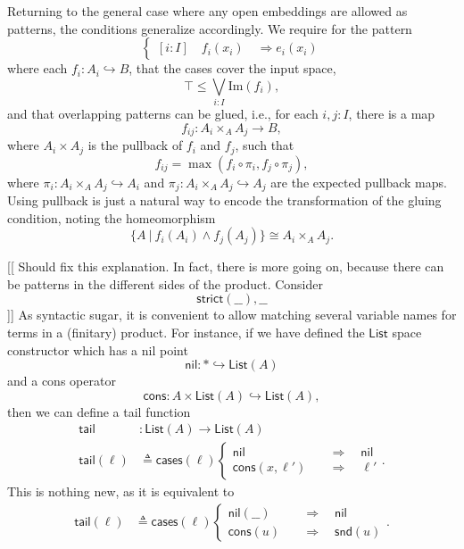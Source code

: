 \documentclass[conference]{IEEEtran}
\newcommand{\hookto}{\hookrightarrow}
\newcommand{\suchthat}{\ |\ }
\newcommand{\One}{\ast}
\newcommand{\wildcard}{\_\_}
\newcommand{\Img}[1]{\text{Im}\left({#1}\right)}
\newcommand{\Branch}{\Rightarrow}
\begin{document}
Returning to the general case where any open embeddings are allowed as patterns, the conditions generalize accordingly. We require for the pattern
\[
\begin{cases}
[i : I] \quad f_i(x_i) \quad \Branch e_i(x_i)
\end{cases}
\]
where each $f_i : A_i \hookto B$, that the cases cover the input space,
\[
\top \le \bigvee_{i : I} \Img{f_i},
\]
and that overlapping patterns can be glued, i.e., for each $i, j : I$, there is a map
\[
f_{ij} : A_i \times_A A_j \to B,
\]
where $A_i \times A_j$ is the pullback of $f_i$ and $f_j$, such that 
\[
f_{ij} = \max(f_i \circ \pi_i, f_j \circ \pi_j),
\]
where $\pi_i : A_i \times_A A_j \hookto A_i$ and $\pi_j : A_i \times_A A_j \hookto A_j$ are the expected pullback maps. Using pullback is just a natural way to encode the transformation of the gluing condition, noting the homeomorphism
\[
 \{A \suchthat f_i(A_i) \wedge f_j(A_j) \} \cong A_i \times_A A_j.
\]

[[ Should fix this explanation. In fact, there is more going on, because there can be patterns in the different sides of the product. Consider
\[
\mathsf{strict}(\wildcard), \wildcard
\]
]]
As syntactic sugar, it is convenient to allow matching several variable names for terms in a (finitary) product. For instance, if we have defined the $\mathsf{List}$ space constructor which has a nil point
\[
\mathsf{nil} : \One \hookto \mathsf{List}(A)
\]
and a cons operator
\[
\mathsf{cons} : A \times \mathsf{List}(A) \hookto \mathsf{List}(A),
\]
then we can define a tail function
\begin{align*}
\mathsf{tail} &: \mathsf{List}(A) \to \mathsf{List}(A)
\\ \mathsf{tail}(\ell) &\triangleq \mathsf{cases}(\ell)
\begin{cases}
\mathsf{nil} \quad &\Branch \quad \mathsf{nil}
\\ \mathsf{cons}(x, \ell') \quad &\Branch \quad \ell'
\end{cases}.
\end{align*}
This is nothing new, as it is equivalent to
\begin{align*}
\mathsf{tail}(\ell) &\triangleq \mathsf{cases}(\ell)
\begin{cases}
\mathsf{nil}(\wildcard) \quad &\Branch \quad \mathsf{nil}
\\ \mathsf{cons}(u) \quad &\Branch \quad \mathsf{snd}(u)
\end{cases}.
\end{align*}
\end{document}
